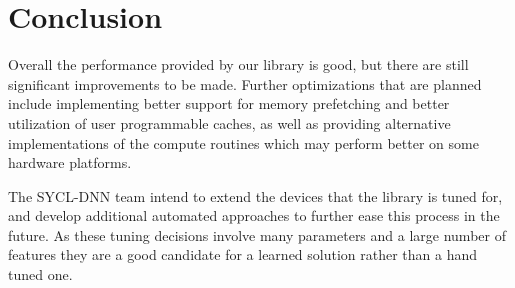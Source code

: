 \documentclass[sigconf]{acmart}
\begin{document}
\section{Conclusion}

Overall the performance provided by our library is good, but there are still
significant improvements to be made. Further optimizations that are planned
include implementing better support for memory prefetching and better
utilization of user programmable caches, as well as providing alternative
implementations of the compute routines which may perform better on some
hardware platforms.

The SYCL-DNN team intend to extend the devices that the library is tuned for,
and develop additional automated approaches to further ease this process in the
future. As these tuning decisions involve many parameters and a large number of
features they are a good candidate for a learned solution rather than a hand
tuned one.

%


\end{document}
